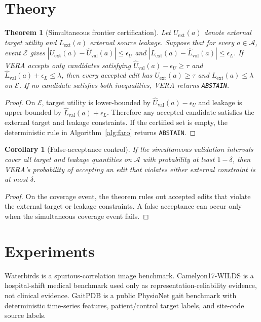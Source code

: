 \documentclass[letterpaper]{article}
\newtheorem{theorem}{Theorem}
\newtheorem{corollary}{Corollary}
\begin{document}
\section{Theory}

\begin{theorem}[Simultaneous frontier certification]
Let $U_{\mathrm{ext}}(a)$ denote external target utility and
$L_{\mathrm{ext}}(a)$ external source leakage. Suppose that for every
$a\in\mathcal{A}$, event $\mathcal{E}$ gives
$|U_{\mathrm{ext}}(a)-\widehat U_{\mathrm{val}}(a)|\le\epsilon_U$ and
$|L_{\mathrm{ext}}(a)-\widehat L_{\mathrm{val}}(a)|\le\epsilon_L$. If VERA
accepts only candidates satisfying
$\widehat U_{\mathrm{val}}(a)-\epsilon_U\ge\tau$ and
$\widehat L_{\mathrm{val}}(a)+\epsilon_L\le\lambda$, then every accepted edit
has $U_{\mathrm{ext}}(a)\ge\tau$ and
$L_{\mathrm{ext}}(a)\le\lambda$ on $\mathcal{E}$. If no candidate satisfies
both inequalities, VERA returns \texttt{ABSTAIN}.
\end{theorem}

\begin{proof}
On $\mathcal{E}$, target utility is lower-bounded by
$\widehat U_{\mathrm{val}}(a)-\epsilon_U$ and leakage is upper-bounded by
$\widehat L_{\mathrm{val}}(a)+\epsilon_L$. Therefore any accepted candidate
satisfies the external target and leakage constraints. If the certified set is
empty, the deterministic rule in Algorithm~\ref{alg:faro} returns
\texttt{ABSTAIN}.
\end{proof}

\begin{corollary}[False-acceptance control]
If the simultaneous validation intervals cover all target and leakage
quantities on $\mathcal{A}$ with probability at least $1-\delta$, then VERA's
probability of accepting an edit that violates either external constraint is at
most $\delta$.
\end{corollary}

\begin{proof}
On the coverage event, the theorem rules out accepted edits that violate the
external target or leakage constraints. A false acceptance can occur only when
the simultaneous coverage event fails.
\end{proof}

\section{Experiments}

Waterbirds is a spurious-correlation image benchmark. Camelyon17-WILDS is a
hospital-shift medical benchmark used only as representation-reliability
evidence, not clinical evidence. GaitPDB is a public PhysioNet gait benchmark
with deterministic time-series features, patient/control target labels, and
site-code source labels.
\end{document}
